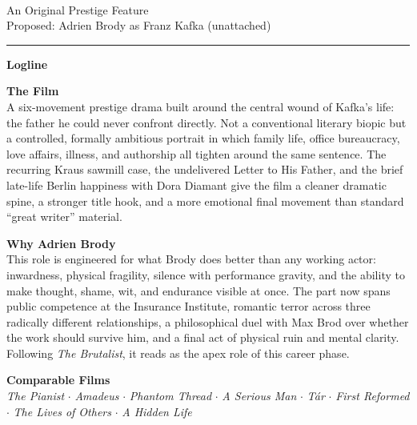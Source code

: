 \documentclass[11pt,letterpaper]{article}
\begin{document}
\begin{center}
{\Large\bfseries\sffamily \filmtitleupper}\\[4pt]
{\normalsize\sffamily\color{kafkagray} An Original Prestige Feature}\\[2pt]
{\small\color{kafkalight} Proposed: Adrien Brody as Franz Kafka (unattached)}
\end{center}

\vspace{4pt}
\textcolor{sectionrule}{\rule{\textwidth}{0.5pt}}
\vspace{4pt}

\textbf{Logline}\\
\filmlogline

\vspace{4pt}

\textbf{The Film}\\
A six-movement prestige drama built around the central wound of Kafka's life: the father he could never confront directly. Not a conventional literary biopic but a controlled, formally ambitious portrait in which family life, office bureaucracy, love affairs, illness, and authorship all tighten around the same sentence. The recurring Kraus sawmill case, the undelivered Letter to His Father, and the brief late-life Berlin happiness with Dora Diamant give the film a cleaner dramatic spine, a stronger title hook, and a more emotional final movement than standard ``great writer'' material.

\vspace{4pt}

\textbf{Why Adrien Brody}\\
This role is engineered for what Brody does better than any working actor: inwardness, physical fragility, silence with performance gravity, and the ability to make thought, shame, wit, and endurance visible at once. The part now spans public competence at the Insurance Institute, romantic terror across three radically different relationships, a philosophical duel with Max Brod over whether the work should survive him, and a final act of physical ruin and mental clarity. Following \textit{The Brutalist}, it reads as the apex role of this career phase.

\vspace{4pt}

\textbf{Comparable Films}\\
\textit{The Pianist} $\cdot$ \textit{Amadeus} $\cdot$ \textit{Phantom Thread} $\cdot$ \textit{A Serious Man} $\cdot$ \textit{T\'{a}r} $\cdot$ \textit{First Reformed} $\cdot$ \textit{The Lives of Others} $\cdot$ \textit{A Hidden Life}
\end{document}
